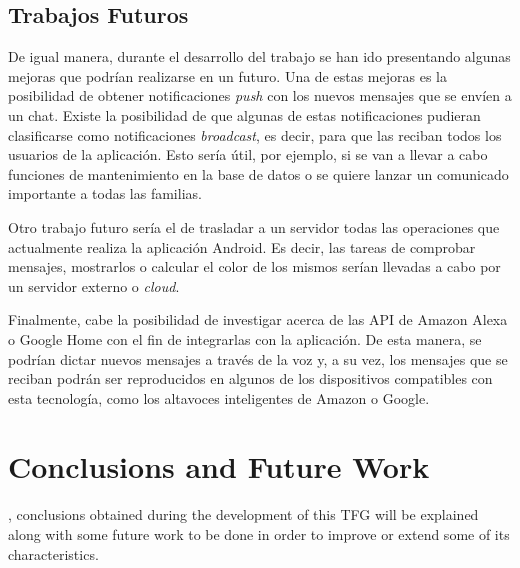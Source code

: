 \clearpage

\section{Trabajos Futuros}
De igual manera, durante el desarrollo del trabajo se han ido presentando algunas mejoras que podrían realizarse en un futuro. Una de estas mejoras es la posibilidad de obtener notificaciones \textit{push} con los nuevos mensajes que se envíen a un chat. Existe la posibilidad de que algunas de estas notificaciones pudieran clasificarse como notificaciones \textit{broadcast}, es decir, para que las reciban todos los usuarios de la aplicación. Esto sería útil, por ejemplo, si se van a llevar a cabo funciones de mantenimiento en la base de datos o se quiere lanzar un comunicado importante a todas las familias.

Otro trabajo futuro sería el de trasladar a un servidor todas las operaciones que actualmente realiza la aplicación Android. Es decir, las tareas de comprobar mensajes, mostrarlos o calcular el color de los mismos serían llevadas a cabo por un servidor externo o \textit{cloud}.

Finalmente, cabe la posibilidad de investigar acerca de las \acs{API} de Amazon Alexa o Google Home con el fin de integrarlas con la aplicación. De esta manera, se podrían dictar nuevos mensajes a través de la voz y, a su vez, los mensajes que se reciban podrán ser reproducidos en algunos de los dispositivos compatibles con esta tecnología, como los altavoces inteligentes de Amazon o Google.


\setcounter{chapter}{5}
\chapter{Conclusions and Future Work}
, conclusions obtained during the development of this \acs{TFG} will be explained along with some future work to be done in order to improve or extend some of its \mbox{characteristics}.

